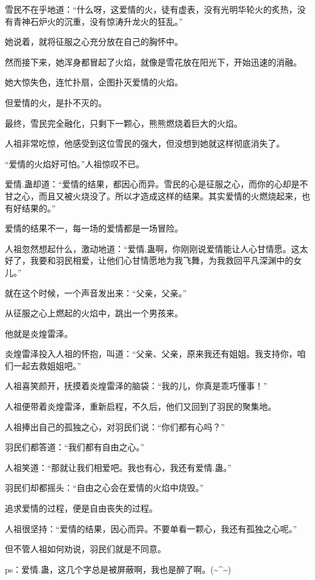 \begin{this_body}
雪民不在乎地道：“什么呀，这爱情的火，徒有虚表，没有光明华轮火的炙热，没有青神石炉火的沉重，没有惊涛升龙火的狂乱。”

她说着，就将征服之心充分放在自己的胸怀中。

然而接下来，她浑身都冒起了火焰，就像是雪花放在阳光下，开始迅速的消融。

她大惊失色，连忙扑扇，企图扑灭爱情的火焰。

但爱情的火，是扑不灭的。

最终，雪民完全融化，只剩下一颗心，熊熊燃烧着巨大的火焰。

人祖非常吃惊，他感受到这位雪民的强大，但没想到她就这样彻底消失了。

“爱情的火焰好可怕。”人祖惊叹不已。

爱情.蛊却道：“爱情的结果，都因心而异。雪民的心是征服之心，而你的心却是不甘之心，而且又被火烧没了。所以才造成这样的结果。其实爱情的火燃烧起来，也有好结果的。”

爱情的结果不一，每一场的爱情都是一场冒险。

人祖忽然想起什么，激动地道：“爱情.蛊啊，你刚刚说爱情能让人心甘情愿。这太好了，我要和羽民相爱，让他们心甘情愿地为我飞舞，为我救回平凡深渊中的女儿。”

就在这个时候，一个声音发出来：“父亲，父亲。”

从征服之心上燃起的火焰中，跳出一个男孩来。

他就是炎煌雷泽。

炎煌雷泽投入人祖的怀抱，叫道：“父亲、父亲，原来我还有姐姐。我支持你，咱们一起去救姐姐吧。”

人祖喜笑颜开，抚摸着炎煌雷泽的脑袋：“我的儿，你真是乖巧懂事！”

人祖便带着炎煌雷泽，重新启程，不久后，他们又回到了羽民的聚集地。

人祖捧出自己的孤独之心，对羽民们说：“你们都有心吗？”

羽民们都答道：“我们都有自由之心。”

人祖笑道：“那就让我们相爱吧。我也有心，我还有爱情.蛊。”

羽民们却都摇头：“自由之心会在爱情的火焰中烧毁。”

追求爱情的过程，便是自由丧失的过程。

人祖很坚持：“爱情的结果，因心而异。不要单看一颗心，我还有孤独之心呢。”

但不管人祖如何劝说，羽民们就是不同意。

ps：爱情.蛊，这几个字总是被屏蔽啊，我也是醉了啊。(\~{}\^{}\~{})

\end{this_body}


